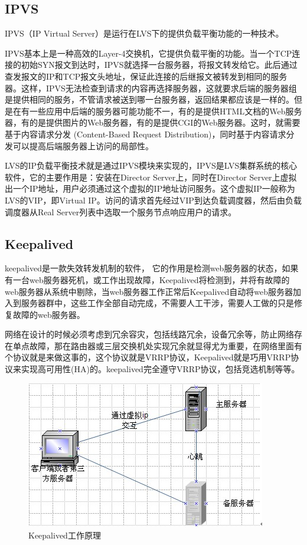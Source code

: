 \subsection{IPVS}
IPVS（IP Virtual Server）是运行在LVS下的提供负载平衡功能的一种技术。

IPVS基本上是一种高效的Layer-4交换机，它提供负载平衡的功能。当一个TCP连接的初始SYN报文到达时，IPVS就选择一台服务器，将报文转发给它。此后通过查发报文的IP和TCP报文头地址，保证此连接的后继报文被转发到相同的服务器。这样，IPVS无法检查到请求的内容再选择服务器，这就要求后端的服务器组是提供相同的服务，不管请求被送到哪一台服务器，返回结果都应该是一样的。但是在有一些应用中后端的服务器可能功能不一，有的是提供HTML文档的Web服务器，有的是提供图片的Web服务器，有的是提供CGI的Web服务器。这时，就需要基于内容请求分发 (Content-Based Request Distribution)，同时基于内容请求分发可以提高后端服务器上访问的局部性。

LVS的IP负载平衡技术就是通过IPVS模块来实现的，IPVS是LVS集群系统的核心软件，它的主要作用是：安装在Director Server上，同时在Director Server上虚拟出一个IP地址，用户必须通过这个虚拟的IP地址访问服务。这个虚拟IP一般称为LVS的VIP，即Virtual IP。访问的请求首先经过VIP到达负载调度器，然后由负载调度器从Real Server列表中选取一个服务节点响应用户的请求。

\subsection{Keepalived}
keepalived是一款失效转发机制的软件， 它的作用是检测web服务器的状态，如果有一台web服务器死机，或工作出现故障，Keepalived将检测到，并将有故障的web服务器从系统中剔除，当web服务器工作正常后Keepalived自动将web服务器加入到服务器群中，这些工作全部自动完成，不需要人工干涉，需要人工做的只是修复故障的web服务器。

网络在设计的时候必须考虑到冗余容灾，包括线路冗余，设备冗余等，防止网络存在单点故障，那在路由器或三层交换机处实现冗余就显得尤为重要，在网络里面有个协议就是来做这事的，这个协议就是VRRP协议，Keepalived就是巧用VRRP协议来实现高可用性(HA)的。keepalived完全遵守VRRP协议，包括竞选机制等等。


\begin{figure}[ht]
	\begin{center}
		\includegraphics[keepaspectratio,width=0.5\paperwidth]{Pictures/Network/keepalivedIllus.jpg}
	\caption{Keepalived工作原理}
	\label{fig:keepalivedIllus}
	\end{center}
\end{figure}

